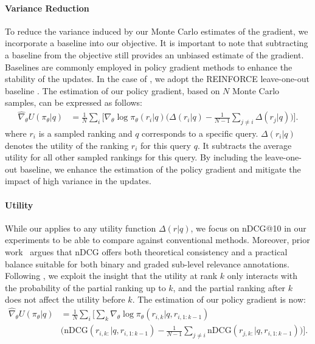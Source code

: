 \documentclass{article}
\begin{document}
\paragraph{Variance Reduction} To reduce the variance induced by our Monte Carlo estimates of the gradient, we incorporate a baseline into our objective. It is important to note that subtracting a baseline from the objective still provides an unbiased estimate of the gradient. Baselines are commonly employed in policy gradient methods to enhance the stability of the updates. In the case of \alg{}, we adopt the REINFORCE leave-one-out baseline \citep{kool2019buy}. The estimation of our policy gradient, based on $N$ Monte Carlo samples, can be expressed as follows:
\begin{align}
    \widehat{\nabla}_\theta U(\pi_\theta | q) &= \frac{1}{N}\sum_i \Big[ \nabla_\theta \log \pi_\theta(r_i | q) \Big(\Delta (r_i|q) - \frac{1}{N - 1}\sum_{j\neq i}\Delta (r_j|q)\Big)\Big].
    \label{eq:pg_baseline}
\end{align}
where $r_i$ is a sampled ranking and $q$ corresponds to a specific query. $\Delta (r_i|q)$ denotes the utility of the ranking $r_i$ for this query $q$. It subtracts the average utility for all other sampled rankings for this query. By including the leave-one-out baseline, we enhance the estimation of the policy gradient and mitigate the impact of high variance in the updates.


\paragraph{Utility} While our \alg{} applies to any utility function $\Delta (r|q)$, we focus on nDCG@10 in our experiments to be able to compare against conventional methods. Moreover, prior work~\cite[e.g.,][]{Wang2013ATA, Thakur2021BEIRAH} argues that nDCG offers both theoretical consistency and a practical balance suitable for both binary and graded sub-level relevance annotations. Following \cite{oosterhuis2021computationally}, we exploit the insight that the utility at rank $k$ only interacts with the probability of the partial ranking up to $k$, and the partial ranking after $k$ does not affect the utility before $k$. The estimation of our policy gradient is now:
\begin{align}
    \widehat{\nabla}_\theta U(\pi_\theta | q) &= \frac{1}{N}\sum_i \Big[\sum_k \nabla_\theta \log \pi_\theta(r_{i,k} | q, r_{i,1:k-1}) \nonumber\\
    & \Big(\text{nDCG} (r_{i,k:}|q, r_{i,1:k-1}) - \frac{1}{N - 1}\sum_{j\neq i}\text{nDCG} (r_{j,k:}|q, r_{i,1:k-1})\Big)\Big].
    \label{eq:pg_baseline_ndcg}
\end{align}
\end{document}
